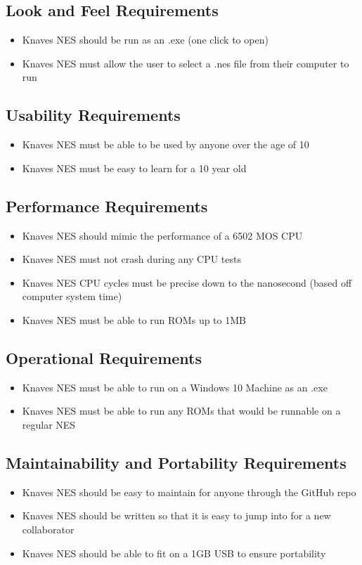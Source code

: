 \documentclass[12pt]{article}
\begin{document}
	\subsection{Look and Feel Requirements}
		\begin{itemize}
			\item Knaves NES should be run as an .exe (one click to open)
			\item Knaves NES must allow the user to select a .nes file from their computer to run
		\end{itemize}
	\subsection{Usability Requirements}
		\begin{itemize}
			\item Knaves NES must be able to be used by anyone over the age of 10
			\item Knaves NES must be easy to learn for a 10 year old
		\end{itemize}
	\subsection{Performance Requirements}
		\begin{itemize}
			\item Knaves NES should mimic the performance of a 6502 MOS CPU
			\item Knaves NES must not crash during any CPU tests
			\item Knaves NES CPU cycles must be precise down to the nanosecond (based off computer system time)
			\item Knaves NES must be able to run ROMs up to 1MB
		\end{itemize}
	\subsection{Operational Requirements}
		\begin{itemize}
			\item Knaves NES must be able to run on a Windows 10 Machine as an .exe
			\item Knaves NES must be able to run any ROMs that would be runnable on a regular NES
		\end{itemize}
	\subsection{Maintainability and Portability Requirements}
		\begin{itemize}
			\item Knaves NES should be easy to maintain for anyone through the GitHub repo
			\item Knaves NES should be written so that it is easy to jump into for a new collaborator
			\item Knaves NES should be able to fit on a 1GB USB to ensure portability
		\end{itemize}
\end{document}
